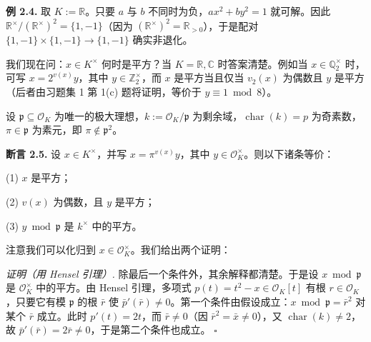 \textbf{例 2.4.} 取 $K:=\mathbb{R}$。只要 $a$ 与 $b$ 不同时为负，$ax^2+by^2=1$ 就可解。因此 $\mathbb{R}^{\times}/(\mathbb{R}^{\times})^2=\{1,-1\}$（因为 $(\mathbb{R}^{\times})^2=\mathbb{R}_{>0}$），于是配对 $\{1,-1\}\times\{1,-1\}\to\{1,-1\}$ 确实非退化。

我们现在问：$x\in K^{\times}$ 何时是平方？当 $K=\mathbb{R},\mathbb{C}$ 时答案清楚。例如当 $x\in\mathbb{Q}_2^{\times}$ 时，可写 $x=2^{v(x)}y$，其中 $y\in\mathbb{Z}_2^{\times}$，而 $x$ 是平方当且仅当 $v_2(x)$ 为偶数且 $y$ 是平方（后者由习题集 1 第 1(c) 题将证明，等价于 $y\equiv 1\bmod 8$）。

设 $\mathfrak{p}\subseteq\mathcal{O}_K$ 为唯一的极大理想，$k:=\mathcal{O}_K/\mathfrak{p}$ 为剩余域，$\operatorname{char}(k)=p$ 为奇素数，$\pi\in\mathfrak{p}$ 为素元，即 $\pi\notin\mathfrak{p}^2$。

\textbf{断言 2.5.} 设 $x\in K^{\times}$，并写 $x=\pi^{v(x)}y$，其中 $y\in\mathcal{O}_K^{\times}$。则以下诸条等价：

(1) $x$ 是平方；

(2) $v(x)$ 为偶数，且 $y$ 是平方；

(3) $y\bmod\mathfrak{p}$ 是 $k^{\times}$ 中的平方。

注意我们可以化归到 $x\in\mathcal{O}_K^{\times}$。我们给出两个证明：

\textit{证明（用 Hensel 引理）.} 除最后一个条件外，其余解释都清楚。于是设 $x\bmod\mathfrak{p}$ 是 $\mathcal{O}_K^{\times}$ 中的平方。由 Hensel 引理，多项式 $p(t)=t^2-x\in\mathcal{O}_K[t]$ 有根 $r\in\mathcal{O}_K$，只要它有模 $\mathfrak{p}$ 的根 $\bar r$ 使 $\bar p'(\bar r)\neq 0$。第一个条件由假设成立：$x\bmod\mathfrak{p}=\bar r^2$ 对某个 $\bar r$ 成立。此时 $p'(t)=2t$，而 $\bar r\neq 0$（因 $\bar r^2=\bar x\neq 0$），又 $\operatorname{char}(k)\neq 2$，故 $\bar p'(\bar r)=2\bar r\neq 0$，于是第二个条件也成立。
\hfill$\square$

